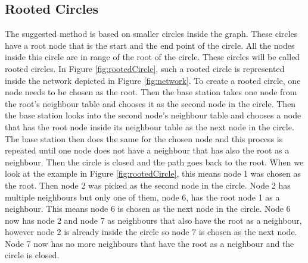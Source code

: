\subsection{Rooted Circles}
The suggested method is based on smaller circles inside the graph. These circles have a root node that is the start and the end point of the circle. All the nodes inside this circle are in range of the root of the circle. These circles will be called rooted circles. In Figure \ref{fig:rootedCircle}, such a rooted circle is represented inside the network depicted in Figure \ref{fig:network}. To create a rooted circle, one node needs to be chosen as the root. Then the base station takes one node from the root's neighbour table and chooses it as the second node in the circle.  Then the base station looks into the second node's neighbour table and chooses a node that has the root node inside its neighbour table as the next node in the circle. The base station then does the same for the chosen node and this process is repeated until one node does not have a neighbour that has also the root as a neighbour. Then the circle is closed and the path goes back to the root. When we look at the example in Figure \ref{fig:rootedCircle}, this means node 1 was chosen as the root. Then node 2 was picked as the second node in the circle. Node 2 has multiple neighbours but only one of them, node 6, has the root node 1 as a neighbour. This means node 6 is chosen as the next node in the circle. Node 6 now has node 2 and node 7 as neighbours that also have the root as a neighbour, however node 2 is already inside the circle so node 7 is chosen as the next node. Node 7 now has no more neighbours that have the root as a neighbour and the circle is closed.

